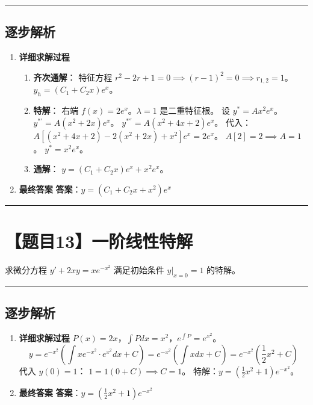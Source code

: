 \documentclass[UTF8]{ctexart}
\newenvironment{redenv}{\color{red}}{}
\newenvironment{detailedanalysis}{%
    \color{red}
    \begin{enumerate}[label=\textbf{第\arabic*步：}, leftmargin=*, align=left, itemsep=1.5ex]
}{%
    \end{enumerate}
}
\newcommand{\problemrule}{\noindent\rule{\textwidth}{1.5pt}\vspace{-0.8em}}
\newcommand{\analysisrule}{\noindent\rule{\textwidth}{0.8pt}\vspace{-0.8em}}
\begin{document}
\begin{redenv}
\analysisrule
\subsection*{逐步解析}

\begin{detailedanalysis}
\item \textbf{详细求解过程}
\begin{enumerate}[label=(\arabic*)]
\item \textbf{齐次通解}：
特征方程 $r^2 - 2r + 1 = 0 \implies (r-1)^2 = 0 \implies r_{1,2} = 1$。
$y_h = (C_1 + C_2 x) e^x$。
\item \textbf{特解}：
右端 $f(x) = 2e^x$。$\lambda = 1$ 是二重特征根。
设 $y^* = A x^2 e^x$。
$y^{*'} = A(x^2+2x)e^x$。
$y^{*''} = A(x^2+4x+2)e^x$。
代入：
$A[(x^2+4x+2) - 2(x^2+2x) + x^2]e^x = 2e^x$。
$A[2] = 2 \implies A=1$。
$y^* = x^2 e^x$。
\item \textbf{通解}：
$y = (C_1 + C_2 x) e^x + x^2 e^x$。
\end{enumerate}

\item \textbf{最终答案}
\textbf{答案}：$ y = (C_1 + C_2 x + x^2) e^x $
\end{detailedanalysis}
\end{redenv}

\problemrule
\section*{【题目13】一阶线性特解}
求微分方程 $ y'+2xy=xe^{-x^{2}} $ 满足初始条件 $ y|_{x=0}=1 $ 的特解。

\begin{redenv}
\analysisrule
\subsection*{逐步解析}

\begin{detailedanalysis}
\item \textbf{详细求解过程}
$P(x) = 2x$，$\int P dx = x^2$，$e^{\int P} = e^{x^2}$。
$$ y = e^{-x^2} (\int x e^{-x^2} \cdot e^{x^2} dx + C) = e^{-x^2} (\int x dx + C) = e^{-x^2} (\frac{1}{2}x^2 + C) $$
代入 $y(0)=1$：
$1 = 1 (0 + C) \implies C = 1$。
特解：$y = (\frac{1}{2}x^2 + 1) e^{-x^2}$。

\item \textbf{最终答案}
\textbf{答案}：$ y = (\frac{1}{2}x^2 + 1) e^{-x^2} $
\end{detailedanalysis}
\end{redenv}
\end{document}

